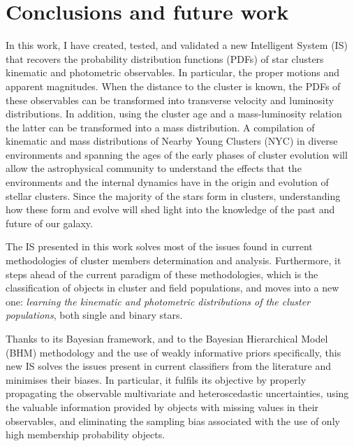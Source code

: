 \chapter{Conclusions and future work}
\label{chap:conclusions}

In this work, I have created, tested, and validated a new Intelligent System (IS) that recovers the probability distribution functions (PDFs) of star clusters kinematic and photometric observables. In particular, the proper motions and apparent magnitudes. When the distance to the cluster is known, the PDFs of these observables can be transformed into transverse velocity and luminosity distributions. In addition, using the cluster age and a mass-luminosity relation the latter can be transformed into a mass distribution. A compilation of kinematic and mass distributions of Nearby Young Clusters (NYC) in diverse environments and spanning the ages of the early phases of cluster evolution will allow the astrophysical community to understand the effects that the environments and the internal dynamics have in the origin and evolution of stellar clusters. Since the majority of the stars form in clusters, understanding how these form and evolve will shed light into the knowledge of the past and future of our galaxy. 

The IS presented in this work solves most of the issues found in current methodologies of cluster members determination and analysis. Furthermore, it steps ahead of the current paradigm of these methodologies, which is the classification of objects in cluster and field populations, and moves into a new one: \textit{learning the kinematic and photometric distributions of the cluster populations}, both single and binary stars.

Thanks to its Bayesian framework, and to the Bayesian Hierarchical Model (BHM) methodology and the use of weakly informative priors specifically, this new IS solves the issues present in current classifiers from the literature and minimises their biases. In particular, it fulfils its objective by properly propagating the observable multivariate and heteroscedastic uncertainties, using the valuable information provided by objects with missing values in their observables, and eliminating the sampling bias associated with the use of only high membership probability objects.

